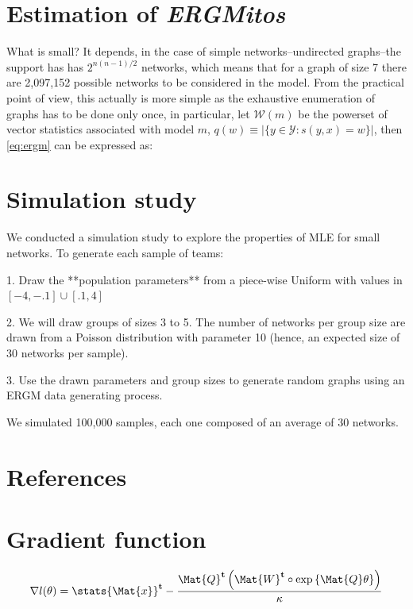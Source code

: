 \documentclass{article}
\begin{document}
\section{Estimation of {\it ERGMitos}}

What is small? It depends, in the case of simple networks--undirected graphs--the support has has $2^{n(n-1)/2}$ networks, which means that for a graph of size 7 there are 2,097,152 possible networks to be considered in the model. From the practical point of view, this actually is more simple as the exhaustive enumeration of graphs has to be done only once, in particular, let $\mathcal{W}(m)$ be the powerset of vector statistics associated with model $m$, $q(w)\equiv |\{y\in\mathcal{Y}: s(y,x) = w\}|$, then \eqref{eq:ergm} can be expressed as:

\section{Simulation study}

We conducted a simulation study to explore the properties of MLE for small networks. To generate each sample of teams:

1. Draw the **population parameters** from a piece-wise Uniform with values in $[-4, -.1]\cup[.1, 4]$

2. We will draw groups of sizes 3 to 5. The number of networks per group size are drawn from a Poisson distribution with parameter 10 (hence, an expected size of 30 networks per sample).

3. Use the drawn parameters and group sizes to generate random graphs using an ERGM data generating process.

We simulated 100,000 samples, each one composed of an average of 30 networks.

\section{References}

\appendix

\section{Gradient function}

\begin{equation}
\nabla l(\theta) = \transpose{\stats{\Mat{x}}} - \frac{\transpose{\Mat{Q}}\left(\transpose{\Mat{W}} \circ \exp{\Mat{Q} \theta}\right)}{\kappa}
\end{equation}
\end{document}
